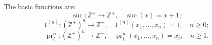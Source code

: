 The basic functions are:
$$\operatorname{suc}: \mathbb{Z}^+ \to \mathbb{Z}^+, \quad \operatorname{suc}(x) = x + 1;$$
$$1^{(n)}: (\mathbb{Z}^+)^n \to \mathbb{Z}^+, \quad 1^{(n)}(x_1, \ldots, x_n) = 1, \quad n \geqslant 0;$$
$$\operatorname{pr}_i^n: (\mathbb{Z}^+)^n \to \mathbb{Z}^+, \quad \operatorname{pr}_i^n(x_1, \ldots, x_n) = x_i, \quad n \geqslant 1.$$